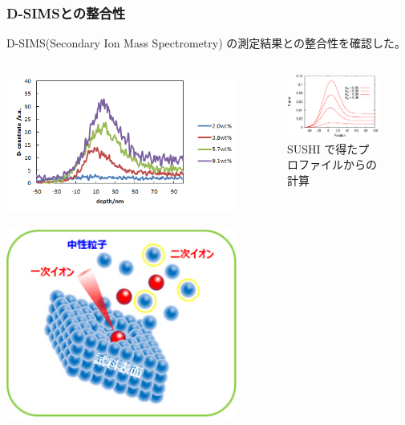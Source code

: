 \documentclass[12pt, dvipdfmx]{beamer}
\begin{document}
\begin{frame}\frametitle{D-SIMSとの整合性}
D-SIMS(Secondary Ion Mass Spectrometry) の測定結果との整合性を確認した。
	\begin{columns}
		\begin{column}{6cm}
				\centering
				\includegraphics[width=.8\textwidth]{D_SIMS_exp.png}

					\includegraphics[width=.6\textwidth]{SIMS.jpg}
			
					
		\end{column}
		\begin{column}{5cm}
			\begin{figure}[htbp]
				\begin{center}
					\includegraphics[width=50mm]{Chi_03_Lf_4.0_SIMS_4.eps}
				\end{center}
				\caption{SUSHI で得たプロファイルからの計算}
		\end{figure}
		\end{column}
	\end{columns}
\end{frame}
\end{document}
